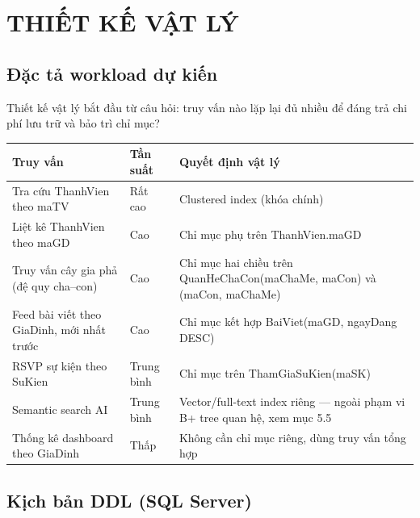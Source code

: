 \chapter{THIẾT KẾ VẬT LÝ}

\section{Đặc tả workload dự kiến}

Thiết kế vật lý bắt đầu từ câu hỏi: truy vấn nào lặp lại đủ nhiều để đáng trả chi phí lưu trữ và bảo trì chỉ mục?

\begin{center}
\begin{tabularx}{\linewidth}{@{}>{\raggedright\arraybackslash}p{4.3cm}l>{\raggedright\arraybackslash}X@{}}
\toprule
\textbf{Truy vấn} & \textbf{Tần suất} & \textbf{Quyết định vật lý} \\
\midrule
Tra cứu ThanhVien theo maTV & Rất cao & Clustered index (khóa chính) \\
Liệt kê ThanhVien theo maGD & Cao & Chỉ mục phụ trên ThanhVien.maGD \\
Truy vấn cây gia phả (đệ quy cha--con) & Cao & Chỉ mục hai chiều trên QuanHeChaCon(maChaMe, maCon) và (maCon, maChaMe) \\
Feed bài viết theo GiaDinh, mới nhất trước & Cao & Chỉ mục kết hợp BaiViet(maGD, ngayDang DESC) \\
RSVP sự kiện theo SuKien & Trung bình & Chỉ mục trên ThamGiaSuKien(maSK) \\
Semantic search AI & Trung bình & Vector/full-text index riêng --- ngoài phạm vi B+ tree quan hệ, xem mục 5.5 \\
Thống kê dashboard theo GiaDinh & Thấp & Không cần chỉ mục riêng, dùng truy vấn tổng hợp \\
\bottomrule
\end{tabularx}
\end{center}

\section{Kịch bản DDL (SQL Server)}

